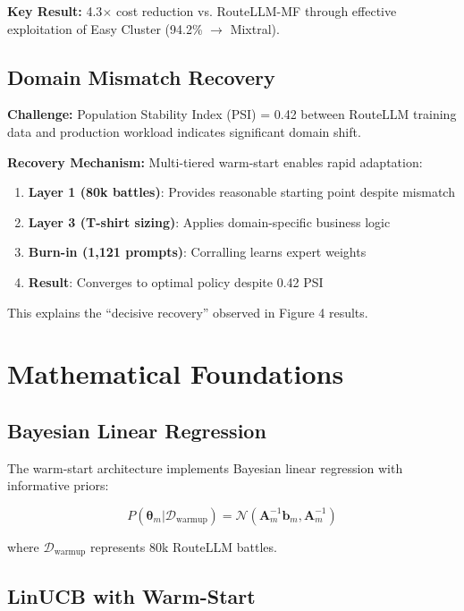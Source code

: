 \documentclass[sigconf]{acmart}
\begin{document}
\textbf{Key Result:} 4.3$\times$ cost reduction vs. RouteLLM-MF through effective exploitation of Easy Cluster (94.2\% $\rightarrow$ Mixtral).

\subsection{Domain Mismatch Recovery}

\textbf{Challenge:} Population Stability Index (PSI) = 0.42 between RouteLLM training data and production workload indicates significant domain shift.

\textbf{Recovery Mechanism:} Multi-tiered warm-start enables rapid adaptation:

\begin{enumerate}
    \item \textbf{Layer 1 (80k battles)}: Provides reasonable starting point despite mismatch
    \item \textbf{Layer 3 (T-shirt sizing)}: Applies domain-specific business logic
    \item \textbf{Burn-in (1,121 prompts)}: Corralling learns expert weights
    \item \textbf{Result}: Converges to optimal policy despite 0.42 PSI
\end{enumerate}

This explains the ``decisive recovery'' observed in Figure 4 results.

\section{Mathematical Foundations}

\subsection{Bayesian Linear Regression}

The warm-start architecture implements Bayesian linear regression with informative priors:

\begin{equation}
P(\boldsymbol{\theta}_m | \mathcal{D}_{\text{warmup}}) = \mathcal{N}(\mathbf{A}_m^{-1}\mathbf{b}_m, \mathbf{A}_m^{-1})
\end{equation}

where $\mathcal{D}_{\text{warmup}}$ represents 80k RouteLLM battles.

\subsection{LinUCB with Warm-Start}
\end{document}
